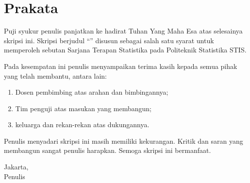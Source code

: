 \chapter*{Prakata}

Puji syukur penulis panjatkan ke hadirat Tuhan Yang Maha Esa atas selesainya
skripsi ini. Skripsi berjudul ``\skJudul'' disusun sebagai salah satu syarat
untuk memperoleh sebutan Sarjana Terapan Statistika pada Politeknik Statistika STIS.

Pada kesempatan ini penulis menyampaikan terima kasih kepada semua pihak yang telah
membantu, antara lain:
\begin{enumerate}[leftmargin=*]
  \item Dosen pembimbing atas arahan dan bimbingannya;
  \item Tim penguji atas masukan yang membangun;
  \item keluarga dan rekan-rekan atas dukungannya.
\end{enumerate}

Penulis menyadari skripsi ini masih memiliki kekurangan. Kritik dan saran yang
membangun sangat penulis harapkan. Semoga skripsi ini bermanfaat.

\vspace{1cm}
\begin{flushright}
\begin{minipage}{6cm}\centering
Jakarta, \skTahun\\[1.5cm]
Penulis
\end{minipage}
\end{flushright}
